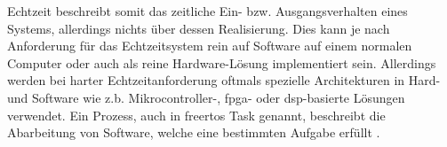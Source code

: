 \documentclass[../EDF Master Thesis.tex]{subfiles}
\begin{document}
    \clearpage

    Echtzeit beschreibt somit das zeitliche Ein- bzw. Ausgangsverhalten eines Systems, allerdings nichts über dessen Realisierung.
    Dies kann je nach Anforderung für das Echtzeitsystem rein auf Software auf einem normalen Computer oder auch als reine Hardware-Lösung implementiert sein.
    Allerdings werden bei harter Echtzeitanforderung oftmals spezielle Architekturen in Hard- und Software wie z.b. Mikrocontroller-, \ac{fpga}- oder \ac{dsp}-basierte Lösungen verwendet.
    Ein Prozess, auch in \ac{freertos} Task genannt, beschreibt die Abarbeitung von Software, welche eine bestimmten Aufgabe erfüllt \autocite{echtzeit_systeme}.

    \clearpage
\end{document}
